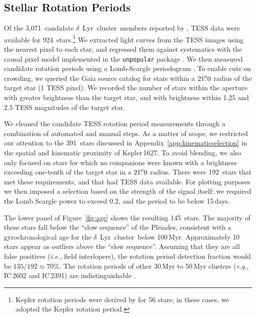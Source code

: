 \documentclass[12pt,modern,twocolumn,tighten]{aastex63}
\newcommand{\cn}{$\delta$\ Lyr\ cluster} %
\newcommand{\noriginal}{3{,}071} %
\newcommand{\nwithtess}{924} %
\newcommand{\nkinwithtess}{391} %
\newcommand{\nkinwithtessandcrowding}{192} %
\newcommand{\nkindefaultcleaning}{145} %
\newcommand{\nrotgood}{135} %
\newcommand{\nfracprot}{70} %
\begin{document}
\subsection{Stellar Rotation Periods}

Of the \noriginal\ candidate \cn\ members reported by
\citet{kounkel_untangling_2019}, TESS data were available for
\nwithtess\ stars.\footnote{Kepler rotation periods were derived by
\citet{mcquillan_rotation_2014} for 56 stars; in these cases, we
adopted the Kepler rotation period.  } We extracted light curves from
the TESS images using the nearest pixel to each star, and regressed
them against systematics with the causal pixel model implemented in
the \texttt{unpopular} package \citep{hattorio_2021_cpm}.  We then
measured candidate rotation periods using a Lomb-Scargle periodogram
\citep{lomb_1976,scargle_studies_1982,astropy_2018}.  To enable cuts
on crowding, we queried the Gaia source catalog for stars within a
$21\mbox{$.\!\!^{\prime\prime}$}0$ radius of the target star (1 TESS pixel).  We recorded the
number of stars within the aperture with greater brightness than the
target star, and with brightness within 1.25 and 2.5 TESS magnitudes
of the target star.  

We cleaned the candidate TESS rotation period measurements through a
combination of automated and manual steps.  As a matter of scope, we
restricted our attention to the \nkinwithtess\ stars discussed in
Appendix~\ref{app:kinematicselection} in the spatial
and kinematic proximity of Kepler\,1627.  To avoid blending, we also only focused on stars
for which no companions were known with a brightness exceeding
one-tenth of the target star in a $21\mbox{$.\!\!^{\prime\prime}$}0$ radius.  There were
\nkinwithtessandcrowding\ stars that met these requirements, and that
had TESS data available.  For plotting purposes we then imposed a
selection based on the strength of the signal itself:
we required the Lomb Scargle power to exceed 0.2, and the period to be
below 15\,days.

The lower panel of Figure~\ref{fig:age} shows the resulting
\nkindefaultcleaning\ stars.  The majority of these stars fall below
the ``slow sequence'' of the Pleiades, consistent with a
gyrochronological age for the \cn\ below 100\,Myr.  Approximately 10
stars appear as outliers above the ``slow sequence''.  Assuming that
they are all false positives ({\it i.e.}, field interlopers), the
rotation period detection fraction would be
$\nrotgood/\nkinwithtessandcrowding \approx \nfracprot\%$.
The rotation periods of other 30\,Myr to 50\,Myr clusters
({\it e.g.}, IC\,2602 and IC\,2391) are indistinguishable
\citep{douglas_stephanie_t_2021_5131306}. 
\end{document}
